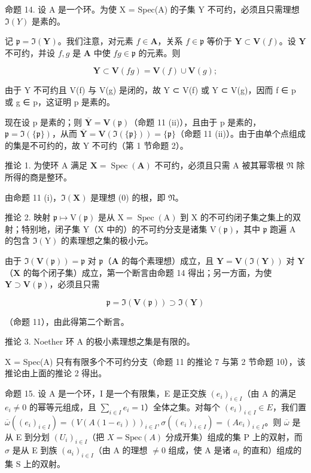 命题 14. 设 A 是一个环。为使 X = Spec(A) 的子集 Y 不可约，必须且只需理想 \(\Im(Y)\) 是素的。

记 \(\mathfrak{p} = \Im(\mathbf{Y})\)。我们注意，对元素 \(f \in \mathbf{A}\)，关系 \(f \in \mathfrak{p}\) 等价于 \(\mathbf{Y} \subset \mathbf{V}(f)\)。设 \(\mathbf{Y}\) 不可约，并设 \(f, g\) 是 \(\mathbf{A}\) 中使 \(fg \in \mathfrak{p}\) 的元素。则

\[
\mathbf {Y} \subset \mathbf {V} (f g) = \mathbf {V} (f) \cup \mathbf {V} (g);
\]

由于 Y 不可约且 V(f) 与 V(g) 是闭的，故 Y ⊂ V(f) 或 Y ⊂ V(g)，因而 f ∈ p 或 g ∈ p，这证明 p 是素的。

现在设 p 是素的；则 \(\overline{\mathbf{Y}} = \mathbf{V}(\mathfrak{p})\)（命题 11 (ii)），且由于 p 是素的，\(\mathfrak{p} = \Im(\{\mathfrak{p}\})\)，从而 \(\overline{\mathbf{Y}} = \mathbf{V}(\Im(\{\mathfrak{p}\})) = \{\mathfrak{p}\}\)（命题 11 (ii)）。由于由单个点组成的集是不可约的，故 Y 不可约（第 1 节命题 2）。

推论 1. 为使环 A 满足 \(\mathbf{X} = \operatorname{Spec}(\mathbf{A})\) 不可约，必须且只需 A 被其幂零根 \(\mathfrak{N}\) 除所得的商是整环。

由命题 11 (i)，\(\Im(\mathbf{X})\) 是理想 (0) 的根，即 \(\mathfrak{N}\)。

推论 2. 映射 \(\mathfrak{p} \mapsto \mathrm{V}(\mathfrak{p})\) 是从 \(\mathrm{X} = \operatorname{Spec}(\mathrm{A})\) 到 \(\mathrm{X}\) 的不可约闭子集之集上的双射；特别地，闭子集 \(\mathrm{Y}\)（\(\mathrm{X}\) 中的）的不可约分支是诸集 \(\mathrm{V}(\mathfrak{p})\)，其中 \(\mathfrak{p}\) 跑遍 \(\mathrm{A}\) 的包含 \(\Im(\mathrm{Y})\) 的素理想之集的极小元。

由于 \(\Im (\mathbf{V}(\mathfrak{p})) = \mathfrak{p}\) 对 \(\mathfrak{p}\)（\(\mathbf{A}\) 的每个素理想）成立，且 \(\mathbf{Y} = \mathbf{V}(\Im (\mathbf{Y}))\) 对 \(\mathbf{Y}\)（\(\mathbf{X}\) 的每个闭子集）成立，第一个断言由命题 14 得出；另一方面，为使 \(\mathbf{Y} \supset \mathbf{V}(\mathfrak{p})\)，必须且只需

\[
\mathfrak {p} = \Im (\mathbf {V} (\mathfrak {p})) \supset \Im (\mathbf {Y})
\]

（命题 11），由此得第二个断言。

推论 3. Noether 环 A 的极小素理想之集是有限的。

X = Spec(A) 只有有限多个不可约分支（命题 11 的推论 7 与第 2 节命题 10），该推论由上面的推论 2 得出。

命题 15. 设 A 是一个环，I 是一个有限集，E 是正交族 \((e_i)_{i \in I}\)（由 A 的满足 \(e_i \neq 0\) 的幂等元组成，且 \(\sum_{i \in I} e_i = 1\)）全体之集。对每个 \((e_i)_{i \in I} \in E\)，我们置 \(\overline{\omega}((e_i)_{i \in I}) = (V(A(1 - e_i)))_{i \in I}, \sigma((e_i)_{i \in I}) = (Ae_i)_{i \in I}\)。则 \(\overline{\omega}\) 是从 E 到分划 \((U_i)_{i \in I}\)（把 \(X = \text{Spec}(A)\) 分成开集）组成的集 P 上的双射，而 \(\sigma\) 是从 E 到族 \((a_i)_{i \in I}\)（由 A 的理想 \(\neq 0\) 组成，使 A 是诸 \(a_i\) 的直和）组成的集 S 上的双射。

